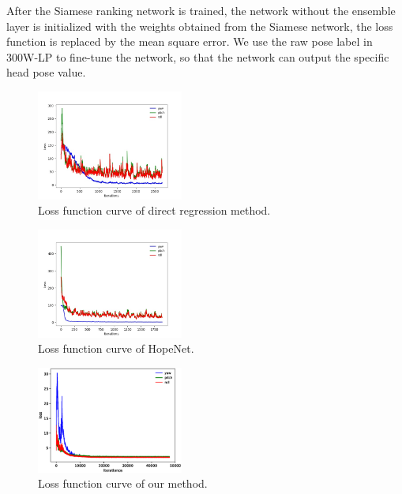 \documentclass[english]{DDCLSconf}
\begin{document}
After the Siamese ranking network is trained, the network without the ensemble layer is initialized with the weights obtained from the Siamese network, the loss function is replaced by the mean square error. We use the raw pose label in 300W-LP to fine-tune the network, so that the network can output the specific head pose value.
\begin{figure}[!tbp]
	\centering
	
	\includegraphics[width=0.43\textwidth]{fig6.jpg}
	\caption{Loss function curve of direct regression method.}	
	\label{loss1}       %
\end{figure}
\begin{figure}[!tbp]
	\centering
	\includegraphics[width=0.43\textwidth]{fig7.jpg}
	\caption{Loss function curve of HopeNet.}	
	\label{loss2}       %
	
\end{figure}
\begin{figure}[!tbp]
	\centering	
	\includegraphics[width=0.43\textwidth]{fig8.eps}
	\caption{Loss function curve of our method.}	
	\label{loss3}       %
\end{figure}
	
\end{document}

